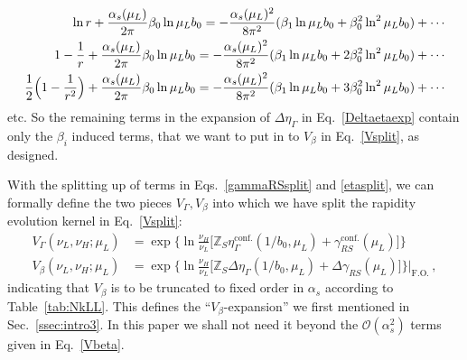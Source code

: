\documentclass[a4,letterpaper,11pt]{article}
\newcommand{\as}{\alpha_s}
\newcommand{\cO}{\mathcal{O}}
\newcommand{\zed}{\mathbb{Z}}
\newcommand{\eq}[1]{Eq.~\eqref{#1}}
\newcommand{\eqs}[2]{Eqs.~\eqref{#1} and \eqref{#2}}
\newcommand{\ssec}[1]{Sec.~\ref{ssec:#1}}
\newcommand{\tab}[1]{Table~\ref{tab:#1}}
\begin{document}
\begin{subequations}
\begin{align}
\ln r + \frac{\as(\mu_L)}{2\pi} \beta_0 \ln \mu_L b_0 = - \frac{\as(\mu_L)^2}{8\pi^2} (\beta_1 \ln \mu_L b_0 + \beta_0^2 \ln^2\mu_L b_0) + \cdots \\
1-\frac{1}{r} + \frac{\as(\mu_L)}{2\pi} \beta_0 \ln \mu_L b_0 = - \frac{\as(\mu_L)^2}{8\pi^2} (\beta_1 \ln \mu_L b_0 + 2 \beta_0^2 \ln^2\mu_L b_0) + \cdots \\
\frac{1}{2}\Bigl(1-\frac{1}{r^2}\Bigr) + \frac{\as(\mu_L)}{2\pi} \beta_0 \ln \mu_L b_0 = - \frac{\as(\mu_L)^2}{8\pi^2} (\beta_1 \ln \mu_L b_0 + 3 \beta_0^2 \ln^2\mu_L b_0) + \cdots 
\end{align}
\end{subequations}
etc. So the remaining terms in the expansion of $\Delta\eta_\Gamma$ in \eq{Deltaetaexp} contain only the $\beta_i$ induced terms, that we want to put in to $V_\beta$ in \eq{Vsplit}, as designed.

With the splitting up of terms in \eqs{gammaRSsplit}{etasplit}, we can formally define the two pieces $V_\Gamma,V_\beta$ into which we have split the rapidity evolution kernel in \eq{Vsplit}:
\begin{subequations}
\label{VGammaVbeta}
\begin{align}
V_\Gamma(\nu_L,\nu_H;\mu_L) &= \exp\biggl\{ \ln\frac{\nu_H}{\nu_L} \bigl[ \zed_S \eta_\Gamma^{\text{conf.}}(1/b_0,\mu_L) + \gamma_{RS}^{\text{conf.}}(\mu_L)\bigr]\biggr\} \\
V_\beta(\nu_L,\nu_H;\mu_L) &=  \exp\biggl\{ \ln\frac{\nu_H}{\nu_L} \bigl[ \zed_S \Delta\eta_\Gamma(1/b_0,\mu_L) + \Delta\gamma_{RS}(\mu_L)\bigr]\biggr\}\biggr\rvert_{\text{F.O.}}\,,
\end{align}
\end{subequations}
indicating that $V_\beta$ is to be truncated to fixed order in $\as$ according to \tab{NkLL}. This defines the ``$V_\beta$-expansion'' we first mentioned in \ssec{intro3}. In this paper we shall not need it beyond the $\cO(\as^2)$ terms given in \eq{Vbeta}.
\end{document}

